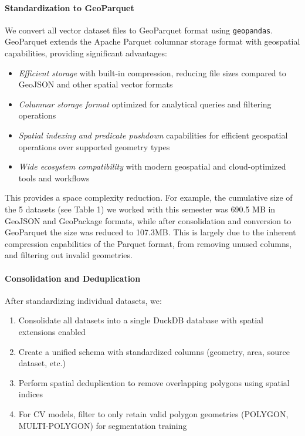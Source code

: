 \begin{multicols}{2}

\paragraph{Standardization to GeoParquet}
We convert all vector dataset files to GeoParquet format using \texttt{geopandas}. GeoParquet extends the Apache Parquet columnar storage format with geospatial capabilities, providing significant advantages:
\begin{itemize}
    \item \textit{Efficient storage} with built-in compression, reducing file sizes compared to GeoJSON and other spatial vector formats
    \item \textit{Columnar storage format} optimized for analytical queries and filtering operations
    \item \textit{Spatial indexing and predicate pushdown} capabilities for efficient geospatial operations over supported geometry types
    \item \textit{Wide ecosystem compatibility} with modern geospatial and cloud-optimized tools and workflows
\end{itemize}

This provides a space complexity reduction. For example, the cumulative size of the 5 datasets (see Table 1) we worked with this semester was 690.5 MB in GeoJSON and GeoPackage formats, 
while after consolidation and conversion to GeoParquet the size was reduced to 107.3MB. This is largely due to the inherent compression capabilities of the Parquet format, from removing unused columns, 
and filtering out invalid geometries. 

\paragraph{Consolidation and Deduplication}
After standardizing individual datasets, we:
\begin{enumerate}
    \item Consolidate all datasets into a single DuckDB database with spatial extensions enabled
    \item Create a unified schema with standardized columns (geometry, area, source dataset, etc.)
    \item Perform spatial deduplication to remove overlapping polygons using spatial indices
    \item For CV models, filter to only retain valid polygon geometries (POLYGON, MULTI-POLYGON) for segmentation training
\end{enumerate}


\end{multicols}
